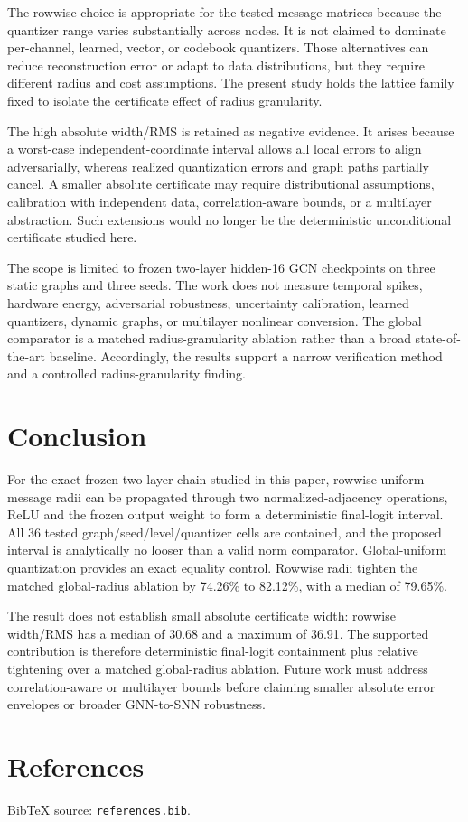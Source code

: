 \documentclass{article}
\begin{document}
The rowwise choice is appropriate for the tested message matrices because the quantizer range varies substantially across nodes. It is not claimed to dominate per-channel, learned, vector, or codebook quantizers. Those alternatives can reduce reconstruction error or adapt to data distributions, but they require different radius and cost assumptions. The present study holds the lattice family fixed to isolate the certificate effect of radius granularity.

The high absolute width/RMS is retained as negative evidence. It arises because a worst-case independent-coordinate interval allows all local errors to align adversarially, whereas realized quantization errors and graph paths partially cancel. A smaller absolute certificate may require distributional assumptions, calibration with independent data, correlation-aware bounds, or a multilayer abstraction. Such extensions would no longer be the deterministic unconditional certificate studied here.

The scope is limited to frozen two-layer hidden-16 GCN checkpoints on three static graphs and three seeds. The work does not measure temporal spikes, hardware energy, adversarial robustness, uncertainty calibration, learned quantizers, dynamic graphs, or multilayer nonlinear conversion. The global comparator is a matched radius-granularity ablation rather than a broad state-of-the-art baseline. Accordingly, the results support a narrow verification method and a controlled radius-granularity finding.

\section{Conclusion}


For the exact frozen two-layer chain studied in this paper, rowwise uniform message radii can be propagated through two normalized-adjacency operations, ReLU and the frozen output weight to form a deterministic final-logit interval. All 36 tested graph/seed/level/quantizer cells are contained, and the proposed interval is analytically no looser than a valid norm comparator. Global-uniform quantization provides an exact equality control. Rowwise radii tighten the matched global-radius ablation by 74.26\% to 82.12\%, with a median of 79.65\%.

The result does not establish small absolute certificate width: rowwise width/RMS has a median of 30.68 and a maximum of 36.91. The supported contribution is therefore deterministic final-logit containment plus relative tightening over a matched global-radius ablation. Future work must address correlation-aware or multilayer bounds before claiming smaller absolute error envelopes or broader GNN-to-SNN robustness.

\section*{References}


BibTeX source: \texttt{references.bib}.



\end{document}
